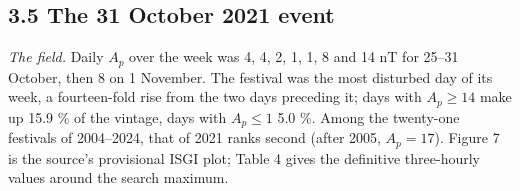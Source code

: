\documentclass[
  10pt,
  a4paper,
]{article}
\begin{document}
\hypertarget{the-31-october-2021-event}{%
\subsection{3.5 The 31 October 2021
event}\label{the-31-october-2021-event}}

\emph{The field.} Daily \(A_p\) over the week was 4, 4, 2, 1, 1, 8 and
14 nT for 25--31 October, then 8 on 1 November. The festival was the
most disturbed day of its week, a fourteen-fold rise from the two days
preceding it; days with \(A_p \ge 14\) make up 15.9 \% of the vintage,
days with \(A_p \le 1\) 5.0 \%. Among the twenty-one festivals of
2004--2024, that of 2021 ranks second (after 2005, \(A_p = 17\)). Figure
7 is the source's provisional ISGI plot; Table 4 gives the definitive
three-hourly values around the search maximum.
\end{document}
